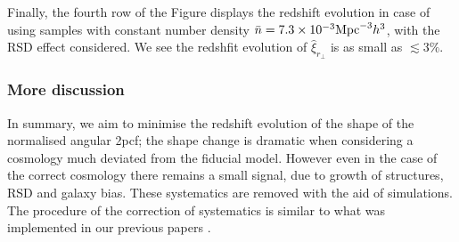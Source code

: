 \documentclass[iop]{emulateapj}
\begin{document}
Finally, the fourth row of the Figure displays the 
redshift evolution in case of using samples with constant number density $\bar n=7.3\times 10^{-3} {\rm Mpc}^{-3}h^3$, 
with the RSD effect considered. %
We see the redshfit evolution of $\hat \xi_{r_\perp}$ is as small as $\lesssim3\%$.









\subsubsection{More discussion}

In summary, we aim to minimise the redshift evolution of the shape of the normalised angular 2pcf; 
the shape change is dramatic when considering a cosmology much deviated from the fiducial model.
However even in the case of the correct cosmology there remains a small signal, due to growth of structures, RSD and galaxy bias. 
These systematics are removed with the aid of simulations.
The procedure of the correction of systematics is similar to what was implemented in our previous papers \cite{Li2014,Li2015,Li2016}.
\end{document}
